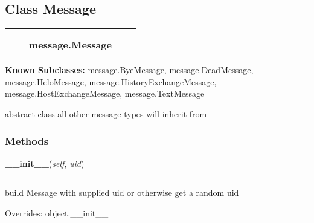 
\subsection{Class Message}

    \label{message:Message}
\begin{tabular}{cccccc}
\multicolumn{2}{r}{\settowidth{\BCL}{object}\multirow{2}{\BCL}{object}}
&&
  \\\cline{3-3}
  &&\multicolumn{1}{c|}{}
&&
  \\
&&\multicolumn{2}{l}{\textbf{message.Message}}
\end{tabular}

\textbf{Known Subclasses:}
message.ByeMessage,
    message.DeadMessage,
    message.HeloMessage,
    message.HistoryExchangeMessage,
    message.HostExchangeMessage,
    message.TextMessage

abstract class all other message types will inherit from



  \subsubsection{Methods}

    \vspace{0.5ex}

\hspace{.8\funcindent}\begin{boxedminipage}{\funcwidth}

    \raggedright \textbf{\_\_init\_\_}(\textit{self}, \textit{uid})

    \vspace{-1.5ex}

    \rule{\textwidth}{0.5\fboxrule}
\setlength{\parskip}{2ex}
    build Message with supplied uid or otherwise get a random uid

\setlength{\parskip}{1ex}
      Overrides: object.\_\_init\_\_

    \end{boxedminipage}

